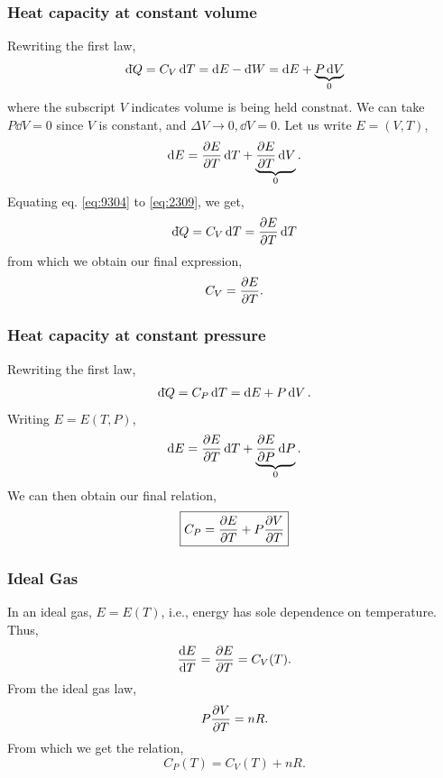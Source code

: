 \documentclass{book}
\newcommand{\dbar}{\mathrm{d}\hspace*{-0.08em}\bar{}\hspace*{0.1em}}
\begin{document}
\subsubsection{Heat capacity at constant volume}
Rewriting the first law,
\begin{equation}
	\dbar Q = C_V\dd{T} = \dd{E} - \dbar W = \dd{E} + \underbrace{P\dd{V}}_0 \label{eq:9304}
\end{equation}
where the subscript $V$ indicates volume is being held constnat. We can take $P\dd{V}= 0$ since $V$ is constant, and $\Delta V \to 0, \dd{V} = 0$. Let us write $E = (V,T)$,
\begin{equation}
	\dd{E} = \pdv{E}{T}\dd{T} + \underbrace{\pdv{E}{T}\dd{V}}_0. \label{eq:2309}
\end{equation}
Equating eq. \eqref{eq:9304} to \eqref{eq:2309}, we get,
\begin{equation}
	\dbar{Q} = C_V\dd{T} = \pdv{E}{T}\dd{T}
\end{equation}
from which we obtain our final expression,
\begin{equation}
	C_V = \pdv{E}{T}.
\end{equation}
\subsubsection{Heat capacity at constant pressure}
Rewriting the first law,
\begin{equation}
	\dbar{Q} = C_P\dd{T} = \dd{E} + P\dd{V}.
\end{equation}
Writing $E = E(T, P)$,
\begin{equation}
	\dd{E} = \pdv{E}{T}\dd{T} + \underbrace{\pdv{E}{P}\dd{P}}_0.
\end{equation}
We can then obtain our final relation,
\begin{equation}
	\boxed{ C_P = \pdv{E}{T} + P\pdv{V}{T} }
\end{equation}
\subsubsection{Ideal Gas}
In an ideal gas, $E = E(T)$, i.e., energy has sole dependence on temperature. Thus,
\begin{equation}
	\dv{E}{T} = \pdv{E}{T} = C_V(T). \label{eq:20}
\end{equation}
From the ideal gas law,
\begin{equation}
	P\pdv{V}{T} = nR.
\end{equation}
From which we get the relation,
\begin{equation}
	\boxed{C_P(T) = C_V(T) + nR}.
\end{equation}
\end{document}
